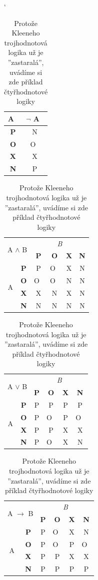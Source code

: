 \documentclass[a4paper,11pt]{article}
\newcommand{\myuv}[1]{\textquotedblright #1\textquotedblright}
\begin{document}
\begin{table}[ht]
\catcode`
\begin{center}
\begin{tabular}[t]{| c | c |} \hline
A~& $\neg$ A~\\ \hline
\textbf{P} & N \\ \hline
\textbf{O} & O~\\ \hline
\textbf{X} & X \\ \hline
\textbf{N} & P \\ \hline
\end{tabular}
\begin{tabular}[t]{| c | c | c | c | c | c |} \hline
\multicolumn{2}{|c|}{\multirow{2}{*}{A $\wedge$ B}} & \multicolumn{4}{|c|}{\it B} \\ \cline{3-6}
\multicolumn{2}{|c|}{} & \textbf{P} & \textbf{O} & \textbf{X} & \textbf{N} \\ \hline
\multirow{4}{*}{A} & \textbf{P} & P & O~& X & N \\ \cline{2-6}
& \textbf{O} & O~& O~& N & N \\ \cline{2-6}
& \textbf{X} & X & N & X & N \\ \cline{2-6}
& \textbf{N} & N & N & N & N \\ \hline
\end{tabular}
\begin{tabular}[t]{| c | c | c | c | c | c |} \hline
\multicolumn{2}{|c|}{\multirow{2}{*}{A $\vee$ B}} & \multicolumn{4}{|c|}{\it B} \\ \cline{3-6}
\multicolumn{2}{|c|}{} & \textbf{P} & \textbf{O} & \textbf{X} & \textbf{N} \\ \hline
\multirow{4}{*}{A} & \textbf{P} & P & P & P & P \\ \cline{2-6}
& \textbf{O} & P & O~& P & O~\\ \cline{2-6}
& \textbf{X} & P & P & X & X \\ \cline{2-6}
& \textbf{N} & P & O~& X & N \\ \hline
\end{tabular}
\begin{tabular}[t]{| c | c | c | c | c | c |} \hline
\multicolumn{2}{|c|}{\multirow{2}{*}{A $\rightarrow$ B}} & \multicolumn{4}{|c|}{\it B} \\ \cline{3-6}
\multicolumn{2}{|c|}{} & \textbf{P} & \textbf{O} & \textbf{X} & \textbf{N} \\ \hline
\multirow{4}{*}{A} & \textbf{P} & P & O~& X & N \\ \cline{2-6}
& \textbf{O} & P & O~& P & O~\\ \cline{2-6}
& \textbf{X} & P & P & X & X \\ \cline{2-6}
& \textbf{N} & P & P & P & P \\ \hline
\end{tabular}
\caption{Protože Kleeneho trojhodnotová logika už je \myuv{zastaralá}, uvádíme si zde příklad čtyřhodnotové
logiky}
\label{tab2}
\end{center}
\end{table}
\end{document}
